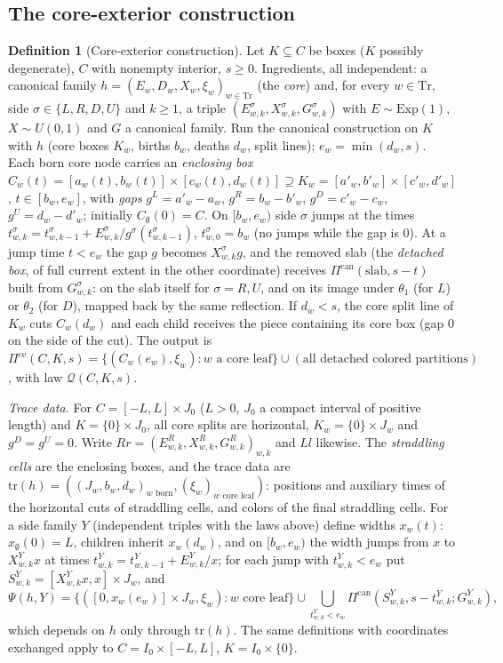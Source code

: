 \documentclass[11pt]{article}
\theoremstyle{plain}
\theoremstyle{definition}
\newtheorem{definition}[theorem]{Definition}
\theoremstyle{remark}
\newcommand{\trd}{\mathrm{tr}}
\begin{document}
\subsection{The core-exterior construction}

\begin{definition}[Core-exterior construction]\label{def:E-coreext}
Let $K\subseteq C$ be boxes ($K$ possibly degenerate), $C$ with nonempty interior,
$s\ge0$. Ingredients, all independent: a canonical family
$h=(E_w,D_w,X_w,\xi_w)_{w\in\mathrm{Tr}}$ (the \emph{core}) and, for every $w\in\mathrm{Tr}$, side
$\sigma\in\{L,R,D,U\}$ and $k\ge1$, a triple $(E^{\sigma}_{w,k},X^{\sigma}_{w,k},G^{\sigma}_{w,k})$ with
$E\sim\mathrm{Exp}(1)$, $X\sim U(0,1)$ and $G$ a canonical family. Run the canonical
construction on $K$ with $h$ (core boxes $K_w$, births $b_w$, deaths $d_w$, split lines);
$e_w=\min(d_w,s)$. Each born core node carries an \emph{enclosing box}
$C_w(t)=[a_w(t),b_w(t)]\times[c_w(t),d_w(t)]\supseteq K_w=[a'_w,b'_w]\times[c'_w,d'_w]$, $t\in[b_w,e_w]$, with
\emph{gaps} $g^{L}=a'_w-a_w$, $g^{R}=b_w-b'_w$, $g^{D}=c'_w-c_w$, $g^{U}=d_w-d'_w$; initially
$C_\emptyset(0)=C$. On $[b_w,e_w)$ side $\sigma$ jumps at the times
$t^{\sigma}_{w,k}=t^{\sigma}_{w,k-1}+E^{\sigma}_{w,k}/g^{\sigma}(t^{\sigma}_{w,k-1})$, $t^{\sigma}_{w,0}=b_w$ (no jumps while the gap is
$0$). At a jump time $t<e_w$ the gap $g$ becomes $X^{\sigma}_{w,k}g$, and the removed slab (the
\emph{detached box}, of full current extent in the other coordinate) receives
$\Pi^{\mathrm{can}}(\text{slab},s-t)$ built from $G^{\sigma}_{w,k}$: on the slab itself for $\sigma=R,U$, and on its
image under $\theta_1$ (for $L$) or $\theta_2$ (for $D$), mapped back by the same reflection.
If $d_w<s$, the core split line of $K_w$ cuts $C_w(d_w)$ and each child receives the
piece containing its core box (gap $0$ on the side of the cut). The output is
$\Pi^{\mathrm{ce}}(C,K,s)=\{(C_w(e_w),\xi_w):w\text{ a core leaf}\}\cup(\text{all detached colored partitions})$,
with law $\mathcal Q(C,K,s)$.

\emph{Trace data.} For $C=[-L,L]\times J_0$ ($L>0$, $J_0$ a compact interval of positive
length) and $K=\{0\}\times J_0$, all core splits are horizontal, $K_w=\{0\}\times J_w$ and
$g^{D}=g^{U}=0$. Write $Rr=(E^{R}_{w,k},X^{R}_{w,k},G^{R}_{w,k})_{w,k}$ and $Ll$ likewise. The
\emph{straddling cells} are the enclosing boxes, and the trace data are
$\trd(h)=((J_w,b_w,d_w)_{w\text{ born}},(\xi_w)_{w\text{ core leaf}})$: positions and auxiliary times of
the horizontal cuts of straddling cells, and colors of the final straddling
cells. For a side family $Y$ (independent triples with the laws above) define widths
$x_w(t)$: $x_\emptyset(0)=L$, children inherit $x_w(d_w)$, and on $[b_w,e_w)$ the width jumps from
$x$ to $X^{Y}_{w,k}x$ at times $t^{Y}_{w,k}=t^{Y}_{w,k-1}+E^{Y}_{w,k}/x$; for each jump with $t^{Y}_{w,k}<e_w$ put
$S^{Y}_{w,k}=[X^{Y}_{w,k}x,x]\times J_w$, and
\[
\Psi(h,Y)=\{([0,x_w(e_w)]\times J_w,\xi_w):w\text{ core leaf}\}\cup\bigcup_{t^{Y}_{w,k}<e_w}\Pi^{\mathrm{can}}(S^{Y}_{w,k},s-t^{Y}_{w,k};G^{Y}_{w,k}),
\]
which depends on $h$ only through $\trd(h)$. The same definitions with coordinates
exchanged apply to $C=I_0\times[-L,L]$, $K=I_0\times\{0\}$.
\end{definition}
\end{document}
